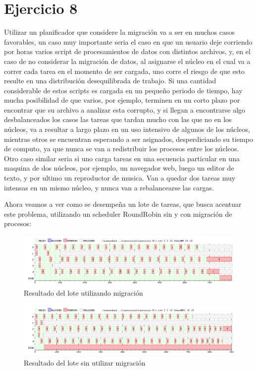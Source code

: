 \documentclass{article}
\begin{document}
\section{Ejercicio 8}

Utilizar un planificador que considere la migración va a ser en muchos casos favorables, un caso muy importante seria el caso en que un usuario deje corriendo por horas varios script de procesamientos de datos con distintos archivos, y, en el caso de no considerar la migración de datos, al asignarse el núcleo en el cual va a correr cada tarea en el momento de ser cargada, uno corre el riesgo de que esto resulte en una distribución desequilibrada de trabajo. Si una cantidad considerable de estos scripts es cargada en un pequeño periodo de tiempo, hay mucha posibilidad de que varios, por ejemplo, terminen en un corto plazo por encontrar que su archivo a analizar esta corrupto, y si llegan a encontrarse algo desbalanceados los casos las tareas que tardan mucho con las que no en los núcleos, va a resultar a largo plazo en un uso intensivo de algunos de los núcleos, mientras otros se encuentran esperando a ser asignados, desperdiciando su tiempo de computo, ya que nunca se van a redistribuir los procesos entre los núcleos. Otro caso similar seria si uno carga tareas en una secuencia particular en una maquina de dos núcleos, por ejemplo, un navegador web, luego un editor de texto, y por ultimo un reproductor de musica. Van a quedar dos tareas muy intensas en un mismo núcleo, y nunca van a rebalancearse las cargas.

Ahora veamos a ver como se desempeña un lote de tareas, que busca acentuar este problema, utilizando un scheduler RoundRobin sin y con migración de procesos:

\begin{figure}[h!]
\caption{Resultado del lote utilizando migración \label{grf:ex8-1m}}
\centering
\includegraphics[width=15cm]{../ejercicios/ejercicio 8-1RR}
\end{figure}

\begin{figure}[h!]
\caption{Resultado del lote sin utilizar migración \label{grf:ex8-1}}
\centering
\includegraphics[width=15cm]{../ejercicios/ejercicio 8-1}
\end{figure}
\end{document}

